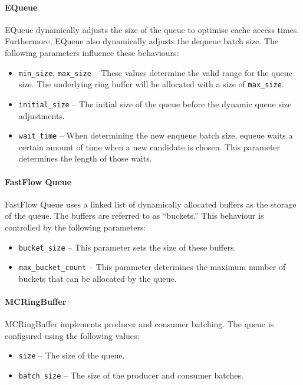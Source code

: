 \paragraph{EQueue}
EQueue dynamically adjusts the size of the queue to optimise cache access times\cite{EQueue}. Furthermore,
EQueue also dynamically adjusts the dequeue batch size. The following parameters influence these behaviours:
\begin{itemize}
    \item \texttt{min\_size}, \texttt{max\_size} -- These values determine the valid range for the queue size. The
        underlying ring buffer will be allocated with a size of \texttt{max\_size}.
    \item \texttt{initial\_size} -- The initial size of the queue before the dynamic queue size adjustments.
    \item \texttt{wait\_time} -- When determining the new enqueue batch size, equeue waits a certain amount of
        time when a new candidate is chosen. This parameter determines the length of those waits.
\end{itemize}

\paragraph{FastFlow Queue}
FastFlow Queue uses a linked list of dynamically allocated buffers as the storage of the queue\cite{FastFlowGithub}.
The buffers are referred to as ``buckets.''
This behaviour is controlled by the following parameters:
\begin{itemize}
    \item \texttt{bucket\_size} -- This parameter sets the size of these buffers.
    \item \texttt{max\_bucket\_count} -- This parameter determines the maximum number of buckets that can be
        allocated by the queue.
\end{itemize}

\paragraph{MCRingBuffer}
MCRingBuffer implements producer and consumer batching\cite{MCRingBuffer}.
The queue is configured using the following values:
\begin{itemize}
    \item \texttt{size} -- The size of the queue.
    \item \texttt{batch\_size} -- The size of the producer and consumer batches.
\end{itemize}

